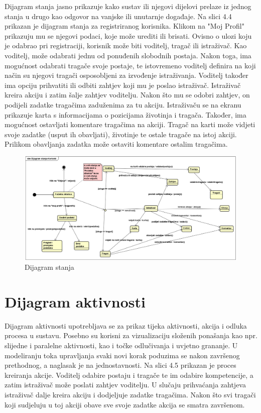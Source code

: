 			Dijagram stanja jasno prikazuje kako sustav ili njegovi dijelovi prelaze iz jednog stanja u drugo kao odgovor na vanjske ili unutarnje događaje. Na slici 4.4 prikazan je dijagram stanja za registriranog korisnika. Klikom na "Moj Profil" prikazuju mu se njegovi podaci, koje može urediti ili brisati. Ovisno o ulozi koju je odabrao pri registraciji, korisnik može biti voditelj, tragač ili istraživač. Kao voditelj, može odabrati jednu od ponuđenih slobodnih postaja. Nakon toga, ima mogućnost odabrati tragače svoje postaje, te istovremeno voditelj definira na koji način su njegovi tragači osposobljeni za izvođenje istraživanja. Voditelj također ima opciju prihvatiti ili odbiti zahtjev koji mu je poslao istraživač. Istraživač kreira akciju i zatim šalje zahtjev voditelju. Nakon što mu se odobri zahtjev, on podijeli zadatke tragačima zaduženima za tu akciju. Istraživaču se na ekranu prikazuje karta s informacijama o pozicijama životinja i tragača. Također, ima mogućnost ostavljati komentare tragačima na akciji. Tragač na karti može vidjeti svoje zadatke (usput ih obavljati), životinje te ostale tragače na istoj akciji. Prilikom obavljanja zadatka može ostaviti komentare ostalim tragačima.
			
			\begin{figure}[H]
				\centering
				\includegraphics[width=\textwidth]{slike/Dijagram_stanja.PNG}
				\caption{Dijagram stanja }
				\label{fig:dijagram_baze}
			\end{figure}
			
			\eject 
		
		\section{Dijagram aktivnosti}
			
		Dijagram aktivnosti upotrebljava se za prikaz tijeka aktivnosti, akcija i odluka procesa u sustavu. Posebno su korisni za vizualizaciju složenih ponašanja kao npr. slijedne i paralelne aktivnosti, kao i točke odlučivanja i uvjetno grananje. U modeliranju toka upravljanja svaki novi korak poduzima se nakon završenog prethodnog, a naglasak je na jednostavnosti. Na slici 4.5 prikazan je proces kreiranja akcije. Voditelj odabire postaju i tragače te im odabire kompetencije, a zatim istraživač može poslati zahtjev voditelju. U slučaju prihvaćanja zahtjeva istraživač dalje kreira akciju i dodjeljuje zadatke tragačima. Nakon što svi tragači koji sudjeluju u toj akciji obave sve svoje zadatke akcija se smatra završenom. 
		

